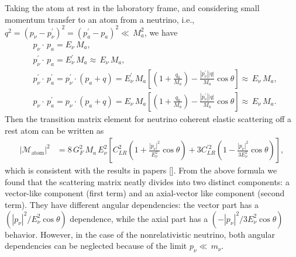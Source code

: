 Taking the atom at rest in the laboratory frame, and considering small momentum transfer to an atom from a neutrino, i.e., $q^2=(p_\nu-p^\prime_\nu)^2=(p_a^\prime-p_a)^2\ll\,M^2_a$, we have
\begin{align}
&p_\nu\cdot\,p_a=E_\nu\,M_a,\\
&p_\nu^\prime\cdot\,p_a=E_\nu^\prime\,M_a\approx\,E_\nu\,M_a,\\
&p^\prime_\nu\cdot\,p^\prime_a=p^\prime_\nu\cdot(p_a+q)=E^\prime_\nu\,M_a\left[\left(1+\frac{q_0}{M_a}\right)-\frac{|p^\prime_\nu||q|}{M_a}\cos\theta\right]\approx\,E_\nu\,M_a,\\
&p_\nu\cdot\,p^\prime_a=p_\nu\cdot(p_a+q)=E_\nu\,M_a\left[\left(1+\frac{q_0}{M_a}\right)-\frac{|p^\prime_\nu||q|}{M_a}\cos\theta\right]\approx\,E_\nu\,M_a.
\end{align}
Then the transition matrix element for neutrino coherent elastic scattering off a rest atom can be written as
\begin{align}\label{M_general}
|\mathcal{M}_{\mathrm{atom}}|^2&=8\,G^2_F\,M_a\,E_\nu^2\left[C^2_{LR}\left(1+\frac{|p_\nu|^2}{E^2_\nu}\cos\theta\right)+3C^{\prime2}_{LR}\left(1-\frac{|p_\nu|^2}{3E_\nu^2}\cos\theta\right)\right],
\end{align}
which is consistent with the results in papers [\cite{PhysRevD.38.32,PhysRevD.21.663,Papavassiliou:2005cs,Smith:1985mta}].
From the above formula we found that the scattering matrix neatly divides into two distinct components: a vector-like component (first term) and an axial-vector like component (second term). They have different angular dependencies: the vector part has a $\left({|p_\nu|^2}/{E^2_\nu}\cos\theta\right)$ dependence, while the axial part has a $\left(-{|p_\nu|^2}/{3E_\nu^2}\cos\theta\right)$ behavior. However, in the case of the nonrelativistic neutrino, both angular dependencies can be neglected because of the limit $p_\nu\ll\,m_\nu$. 


